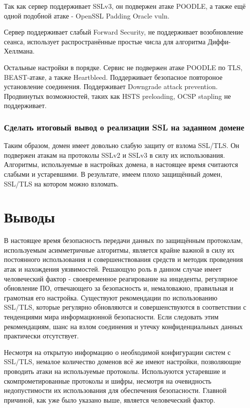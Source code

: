 \documentclass[a4paper]{article}
\begin{document}
Так как сервер поддерживает SSLv3, он подвержен атаке POODLE, а также ещё одной подобной атаке - OpenSSL Padding Oracle vuln.

Сервер поддерживает слабый Forward Security, не поддерживает возобновление сеанса, использует распространённые простые числа для алгоритма Диффи-Хеллмана. 

Остальные настройки в порядке. Сервис не подвержен атаке POODLE по TLS, BEAST-атаке, а также Heartbleed. Поддерживает безопасное повтороное установление соединения. Поддерживает Downgrade attack prevention. Продвинутых возможностей, таких как HSTS preloading, OCSP stapling не поддерживает.

\subsubsection{Сделать итоговый вывод о реализации SSL на заданном домене}

Таким образом, домен имеет довольно слабую защиту от взлома SSL/TLS. Он подвержен атакам на протоколы SSLv2 и SSLv3 в силу их использования. Алгоритмы, используемые в настройках домена, в настоящее время считаются слабыми и устаревшими. В результате, имеем плохо защищённый домен, SSL/TLS на котором можно взломать. 

\section{Выводы}

В настоящее время безопасность передачи данных по защищённым протоколам, используемым асимметричные алгоритмы, является крайне важной в силу их постоянного использования и совершенствования средств и методик проведения атак и нахождения уязвимостей. Решающую роль в данном случае имеет человеческий фактор - своевременное реагирование на инцеденты, регулярное обновление ПО, отвечающего за безопасность и, немаловажно, правильная и грамотная его настройка. Существуют рекомендации по использованию SSL/TLS, которые регулярно обновляются и совершенствуются в соответствии с тенденциями мира информационной безопасности. Если следовать этим рекомендациям, шанс на взлом соединения и утечку конфиденциальных данных практически отсутствует.

Несмотря на открытую информацию о необходимой конфигурации систем с SSL/TLS, немалое количество доменов всё же имеют настройки, позволяющие проводить атаки на используемые протоколы. Используются устаревшие и скомпрометированные протоколы и шифры, несмотря на очевидность недопустимости их использования для обеспечения безопасности. Главной причиной, как уже было указано выше, является человеческий фактор.
\end{document}
